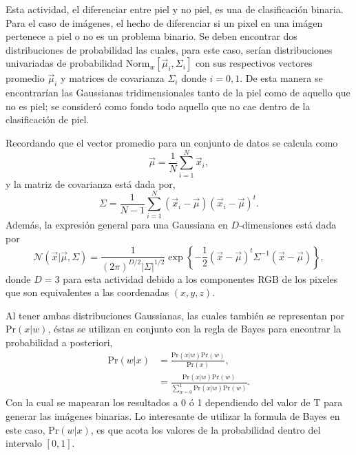 Esta actividad, el diferenciar entre piel y no piel, es una de clasificación binaria. Para el caso de imágenes, el hecho de diferenciar si un pixel en una imágen pertenece a piel o no es un problema binario. Se deben encontrar dos distribuciones de probabilidad las cuales, para este caso, serían distribuciones univariadas de probabilidad $\text{Norm}_{w} [\vec\mu_i, \Sigma_i]$ con sus respectivos vectores promedio $\vec\mu_i$ y matrices de covarianza $\Sigma_i$ donde $i = 0, 1$. De esta manera se encontrarían las Gaussianas tridimensionales tanto de la piel como de aquello que no es piel; se consideró como fondo todo aquello que no cae dentro de la clasificación de piel.

Recordando que el vector promedio para un conjunto de datos se calcula como
\begin{equation*}
    \vec\mu = \frac{1}{N} \sum\limits_{i=1}^{N} \vec{x}_i ,
\end{equation*}
y la matriz de covarianza está dada por,
\begin{equation*}
    \Sigma = \frac{1}{N - 1} \sum\limits_{i=1}^{N} \left(\vec{x}_i - \vec{\mu}\right) \left(\vec{x}_i - \vec{\mu}\right)^t .
\end{equation*}
Además, la expresión general para una Gaussiana en $D$-dimensiones está dada por
\begin{equation*}
    \mathcal{N}(\vec{x}|\vec{\mu}, \Sigma) = \frac{1}{(2 \pi)^{D/2} |\Sigma|^{1/2}} \exp\left\{-\frac{1}{2} (\vec{x} - \vec{\mu})^{t} \Sigma^{-1} (\vec{x} - \vec{\mu}) \right\} ,
\end{equation*}
donde $D=3$ para esta actividad debido a los componentes RGB de los pixeles que son equivalentes a las coordenadas $(x, y, z)$.

Al tener ambas distribuciones Gaussianas, las cuales también se representan por $\text{Pr}(x | w)$, éstas se utilizan en conjunto con la regla de Bayes para encontrar la probabilidad a posteriori,
\begin{align*}
    \text{Pr}(w | x) & = \frac{\text{Pr}(x | w) \text{Pr}(w)}{\text{Pr}(x)} ,\\
    & = \frac{\text{Pr}(x | w) \text{Pr}(w)}{\sum\limits_{w=0}^{1} \text{Pr}(x | w) \text{Pr}(w)} .
\end{align*}
Con la cual se mapearan los resultados a 0 ó 1 dependiendo del valor de $\text{T}$ para generar las imágenes binarias. Lo interesante de utilizar la formula de Bayes en este caso, $\text{Pr}(w | x)$, es que acota los valores de la probabilidad dentro del intervalo $[0,1]$.

